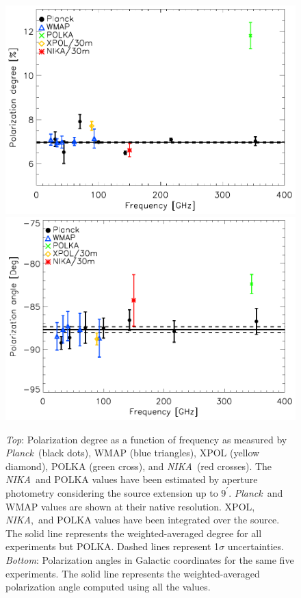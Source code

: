 \documentclass[twocolumn,traditabstract]{aa}
\def\NIKA{\textit{NIKA}}
\def\Planck{\textit{Planck}}
\begin{document}
\begin{figure}
  \centering
          { \includegraphics[width=1\linewidth,keepaspectratio]{figures/pdegree_comparison.pdf}}
          { \includegraphics[width=1\linewidth,keepaspectratio]{figures/angle_comparison.pdf}} 
            \caption{{\it Top}: Polarization degree as a function of frequency as measured by \Planck\ (black dots), WMAP (blue triangles), XPOL (yellow diamond), POLKA (green cross), and \NIKA\ (red crosses). The \NIKA\ and POLKA values have been estimated by aperture photometry considering the source extension up to $9^{\prime}$.  \Planck\ and WMAP values are shown at their native resolution. XPOL, \NIKA,\ and POLKA values have been integrated over the source. The solid line represents the weighted-averaged degree for all experiments but POLKA. Dashed lines represent 1$\sigma$ uncertainties.
            {\it Bottom}: Polarization angles in Galactic coordinates for the same five experiments. The solid line represents the weighted-averaged polarization angle computed using all the values.}
\label{crab_p_angle_comparison}         
  \end{figure}
\end{document}
